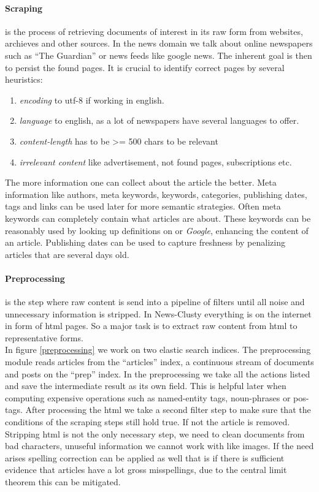   \paragraph{Scraping} is the process of retrieving documents of interest in its raw form from websites, archieves and other sources. In the news domain we talk about online newspapers such as ``The Guardian'' or news feeds like google news. The inherent goal is then to persist the found pages. It is crucial to identify correct pages by several heuristics:

  \begin{enumerate}
    \item \emph{encoding} to utf-8 if working in english.
    \item \emph{language} to english, as a lot of newspapers have several languages to offer.
    \item \emph{content-length} has to be >= 500 chars to be relevant
    \item \emph{irrelevant content} like advertisement, not found pages, subscriptions etc.
  \end{enumerate}

  The more information one can collect about the article the better. Meta information like authors, meta keywords, keywords, categories, publishing dates, tags and links can be used later for more semantic strategies. Often meta keywords can completely contain what articles are about. These keywords can be reasonably used by looking up definitions on \wiki{} or \emph{Google}, enhancing the content of an article. Publishing dates can be used to capture freshness by penalizing articles that are several days old.

  \paragraph{Preprocessing} is the step where raw content is send into a pipeline of filters until all noise and unnecessary information is stripped. In News-Clusty everything is on the internet in form of html pages. So a major task is to extract raw content from html to representative forms.\\
  In figure \ref{preprocessing} we work on two elastic search indices. The preprocessing module reads articles from the ``articles'' index, a continuous stream of documents and posts on the ``prep'' index. In the preprocessing we take all the actions listed and save the intermediate result as its own field. This is helpful later when computing expensive operations such as named-entity tags, noun-phrases or pos-tags. After processing the html we take a second filter step to make sure that the conditions of the scraping steps still hold true. If not the article is removed. Stripping html is not the only necessary step, we need to clean documents from bad characters, unuseful information we cannot work with like images. If the need arises spelling correction can be applied as well that is if there is sufficient evidence that articles have a lot gross misspellings, due to the central limit theorem this can be mitigated.

